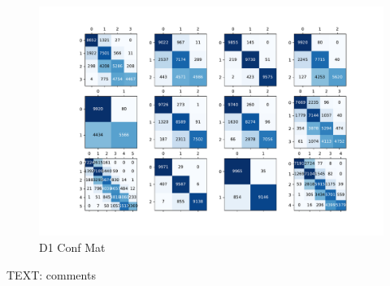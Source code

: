 \documentclass{article}
\begin{document}
	\begin{figure}[htbp]
		\centering
		\includegraphics[width=\linewidth]{Figs/diagnosis1_confusion_matrix.pdf}
		\caption{D1 Conf Mat}
		\vspace{0.3cm}
		\label{fig:D1_conf_mat}
	\end{figure}
	TEXT: comments
	
\end{document}
